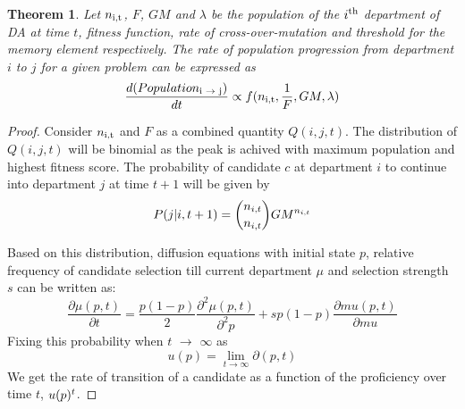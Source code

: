 \documentclass[conference]{IEEEtran}
\newtheorem{theorem}{Theorem}
\begin{document}
\begin{theorem}
Let $n\textsubscript{i,t}$, $F$, $GM$ and $\lambda$ be the population of the $i\textsuperscript{th}$ department of DA at time $t$, fitness function, rate of cross-over-mutation and threshold for the memory element respectively. The rate of population progression from department $i$ to $j$ for a given problem can be expressed as
{\scriptsize
\begin{equation*}
\frac{d(Population\textsubscript{i $\rightarrow$ j})}{dt} \propto f(n\textsubscript{i,t}, \frac{1}{F}, GM, \lambda)
\end{equation*}
}
\end{theorem}

\begin{proof}\renewcommand{\qedsymbol}{}

Consider $n\textsubscript{i,t}$ and $F$ as a combined quantity $Q(i,j,t)$. The distribution of $Q(i,j,t)$ will be binomial as the peak is achived with maximum population and highest fitness score. The probability of candidate $c$ at department $i$ to continue into department $j$ at time $t+1$ will be given by
{\scriptsize
\begin{equation*}
P(j|i,t+1) =  {n\textsubscript{$i$,$t$} \choose n\textsubscript{$i$,$t$}} GM\textsuperscript{$n\textsubscript{$i$,$t$}$}
\end{equation*}
}



Based on this distribution, diffusion equations with initial state $p$, relative frequency of candidate selection till current department $\mu$ and selection strength $s$ can be written as:
{\scriptsize
\begin{equation*}
\frac{\partial \mu(p,t)}{\partial t} = \frac{p(1-p)}{2}\frac{\partial^2 \mu(p,t)}{\partial^2 p} + sp(1-p)\frac{\partial mu(p,t)}{\partial mu}
\end{equation*}
}
Fixing this probability when $t$ $\rightarrow$ $\infty$ as
{\scriptsize
\begin{equation*}
u(p) = \lim_{t \rightarrow \infty} {\partial(p,t)}
\end{equation*}
}
We get the rate of transition of a candidate as a function of the proficiency over time $t$, $u(p)\textsuperscript{$t$}$.
\end{proof}
\end{document}
